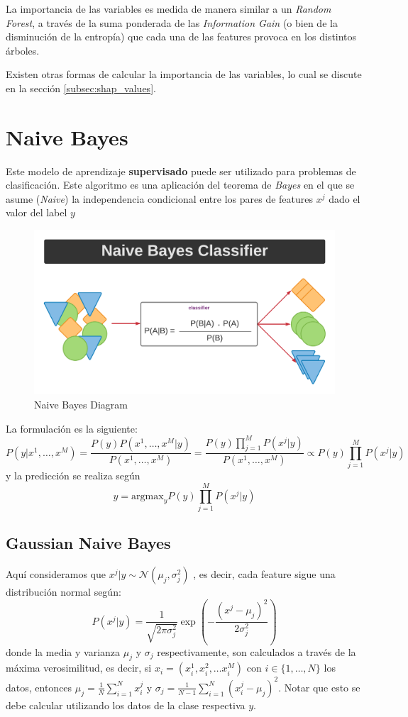 La importancia de las variables es medida de manera similar a un \textit{Random Forest}, a través de la suma ponderada de las \textit{Information Gain} (o bien de la disminución de la entropía) que cada una de las features provoca en los distintos árboles. 

Existen otras formas de calcular la importancia de las variables, lo cual se discute en la sección \ref{subsec:shap_values}.

\section{Naive Bayes}

Este modelo de aprendizaje \textbf{supervisado} puede ser utilizado para problemas de clasificación. Este algoritmo es una aplicación del teorema de \textit{Bayes} en el que se asume (\textit{Naive}) la independencia condicional entre los pares de features $x^j$ dado el valor del label $y$

\begin{figure}[H]
    \center
    \includegraphics[scale=0.4]{notebooks/ML/img/naive_bayes_diagram.png}
    \caption{Naive Bayes Diagram}
\end{figure}

La formulación es la siguiente: 
$$
P(y | x^1 , \dots , x^M) = \frac{P(y)P(x^1 , \dots , x^M| y)}{P(x^1 , \dots , x^M)} = \frac{P(y)\prod_{j=1}^M P(x^j | y)}{P(x^1 , \dots , x^M)} \propto P(y)\prod_{j=1}^M  P(x^j | y)
$$
y la predicción se realiza según 
$$
\hat{y} = \text{argmax}_{y} P(y)\prod_{j=1}^M  P(x^j | y)
$$

\subsection{Gaussian Naive Bayes}

Aquí consideramos que $x^{j} | y \sim \mathcal{N}(\mu_j , \sigma_j^2)$ , es decir, cada feature sigue una distribución normal según:
$$
P(x^j | y) = \frac{1}{\sqrt{2\pi\sigma_j^2}}\exp \left(- \frac{(x^j - \mu_j)^2}{2\sigma_j^2} \right )
$$
donde la media y varianza $\mu_j$ y $\sigma_j$ respectivamente, son calculados a través de la máxima verosimilitud, es decir, si $x_{i} = (x^{1}_i, x^{2}_i, \dots x^{M}_i)$ con $i \in \{1, \dots, N\}$ los datos, entonces
$ \mu_{j} = \frac{1}{N}\sum_{i=1}^{N}x_{i}^{j}$ y $ \sigma_{j} = \frac{1}{N-1}\sum_{i=1}^{N}(x_{i}^{j}-\mu_{j})^2$. Notar que esto se debe calcular utilizando los datos de la clase respectiva $y$. 

